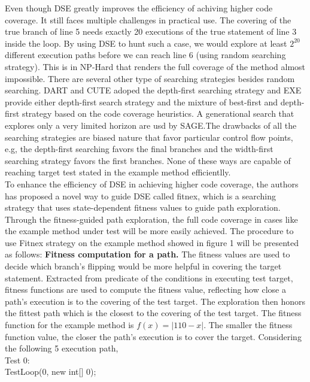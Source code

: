 \indent Even though DSE greatly improves the efficiency of achiving higher code coverage. It still faces multiple challenges in practical use. The covering of the true branch of line 5 needs exactly 20 executions of the true statement of line 3 inside the loop. By using DSE to hunt such a case, we would explore at least $2^{20}$ different execution paths before we can reach line 6 (using random searching strategy). This is in NP-Hard that renders the full coverage of the method almost impossible. 
\indent There are several other type of searching strategies besides random searching. DART and CUTE adoped the depth-first searching strategy and EXE provide either depth-first search strategy and the mixture of best-first and depth-first strategy based on the code coverage heuristics. A generational search that explores only a very limited horizon are usd by SAGE.The drawbacks of all the searching strategies are biased nature that favor particular control flow points, e.g, the depth-first searching favors the final branches and the width-first searching strategy favors the first branches. None of these ways are capable of reaching target test stated in the example method efficientlly.\\
\indent To enhance the efficiency of DSE in achieving higher code coverage, the authors has proposed a novel way to guide DSE called fitnex, which is a searching strategy that uses state-dependent fitness values to guide path exploration. Through the fitness-guided path exploration, the full code coverage in cases like the example method under test will be more easily achieved. The procedure to use Fitnex strategy on the example method showed in figure 1 will be presented as follows:
\indent \textbf{Fitness computation for a path.} The fitness values are used to decide which branch's flipping would be more helpful in covering the target statement. Extracted from predicate of the conditions in executing test target, fitness functions are used to compute the fitness value, reflecting how close a path's execution is to the covering of the test target. The exploration then honors the fittest path which is the closest to the covering of the test target. The fitness function for the example method is $f(x)=|110-x|$. The smaller the fitness function value, the closer the path's execution is to cover the target. Considering the following 5 execution path,\\ 
\noindent Test 0:\\
\hspace*{0.1in}TestLoop(0, new int[] {0});\\
